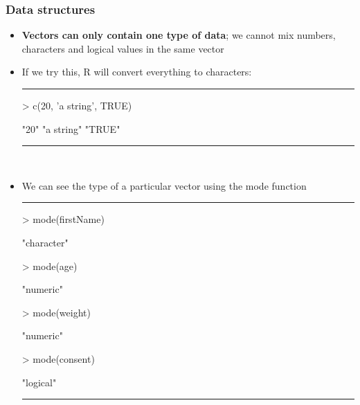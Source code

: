 \documentclass{beamer}
\begin{document}
\begin{frame}[fragile]
	\frametitle{Data structures}
	\begin{itemize}
		\small
		\item \textbf{Vectors can only contain one type of data}; we cannot mix numbers, characters and logical values in the same vector 
		\item If we try this, R will convert everything to characters:
\rule{\textwidth}{0.4pt}
\scriptsize
\begin{Schunk}
\begin{Sinput}
> c(20, 'a string', TRUE)
\end{Sinput}
\begin{Soutput}
[1] "20"       "a string" "TRUE"    
\end{Soutput}
\end{Schunk}
\rule{\textwidth}{0.4pt}\\
\small
\vspace{10pt}
		\item We can see the type of a particular vector using the mode function
\rule{\textwidth}{0.4pt}
\footnotesize
\setlength{\fancyvrbtopsep}{-1pt}
\setlength{\fancyvrbpartopsep}{-1pt}
\begin{Schunk}
\begin{Sinput}
> mode(firstName)
\end{Sinput}
\begin{Soutput}
[1] "character"
\end{Soutput}
\begin{Sinput}
> mode(age)
\end{Sinput}
\begin{Soutput}
[1] "numeric"
\end{Soutput}
\begin{Sinput}
> mode(weight)
\end{Sinput}
\begin{Soutput}
[1] "numeric"
\end{Soutput}
\begin{Sinput}
> mode(consent)
\end{Sinput}
\begin{Soutput}
[1] "logical"
\end{Soutput}
\end{Schunk}
\rule{\textwidth}{0.4pt}\\
		\small
\vspace{10pt}
	\end{itemize}
\end{frame}
\end{document}
